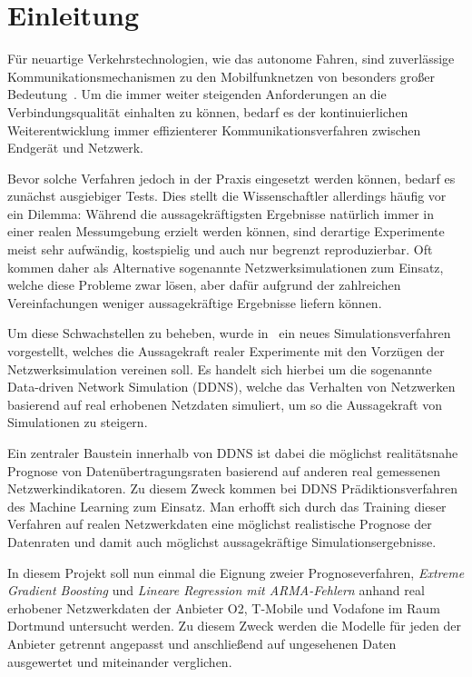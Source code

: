\section{Einleitung}

F\"ur neuartige Verkehrstechnologien, wie das autonome Fahren, sind zuverl\"assige Kommunikationsmechanismen
zu den Mobilfunknetzen von besonders gro{\ss}er Bedeutung~\cite{IEEE}.
Um die immer weiter steigenden Anforderungen an die Verbindungsqualit\"at einhalten zu k\"onnen, bedarf es
der kontinuierlichen Weiterentwicklung immer effizienterer Kommunikationsverfahren zwischen Endger\"at und Netzwerk.

Bevor solche Verfahren jedoch in der Praxis eingesetzt werden k\"onnen, bedarf es zun\"achst ausgiebiger Tests.
Dies stellt die Wissenschaftler allerdings h\"aufig vor ein Dilemma: W\"ahrend die aussagekr\"aftigsten Ergebnisse nat\"urlich
immer in einer realen Messumgebung erzielt werden k\"onnen, sind derartige Experimente meist sehr aufw\"andig, kostspielig und
auch nur begrenzt reproduzierbar.
Oft kommen daher als Alternative sogenannte Netzwerksimulationen zum Einsatz, welche diese Probleme zwar l\"osen, aber daf\"ur
aufgrund der zahlreichen Vereinfachungen weniger aussagekr\"aftige Ergebnisse liefern k\"onnen.

Um diese Schwachstellen zu beheben, wurde in~\cite{IEEE} ein neues Simulationsverfahren vorgestellt,
welches die Aussagekraft realer Experimente
mit den Vorz\"ugen der Netzwerksimulation vereinen soll. Es handelt sich hierbei um die sogenannte Data-driven Network Simulation (DDNS),
welche das Verhalten von Netzwerken basierend auf real erhobenen Netzdaten simuliert, um so die Aussagekraft von Simulationen zu steigern.

Ein zentraler Baustein innerhalb von DDNS ist dabei die m\"oglichst realit\"atsnahe Prognose von Daten\"ubertragungsraten basierend
auf anderen real gemessenen Netzwerkindikatoren.
Zu diesem Zweck kommen bei DDNS Pr\"adiktionsverfahren des Machine Learning zum Einsatz.
Man erhofft sich durch das Training dieser Verfahren auf realen Netzwerkdaten eine m\"oglichst realistische Prognose der Datenraten und
damit auch m\"oglichst aussagekr\"aftige Simulationsergebnisse.

In diesem Projekt soll nun einmal die Eignung zweier Prognoseverfahren, \textit{Extreme Gradient Boosting} und
\textit{Lineare Regression mit ARMA-Fehlern} anhand real erhobener Netzwerkdaten der Anbieter O2, T-Mobile und Vodafone
im Raum Dortmund untersucht werden.
Zu diesem Zweck werden die Modelle f\"ur jeden der Anbieter getrennt angepasst und anschlie{\ss}end auf ungesehenen Daten
ausgewertet und miteinander verglichen.
